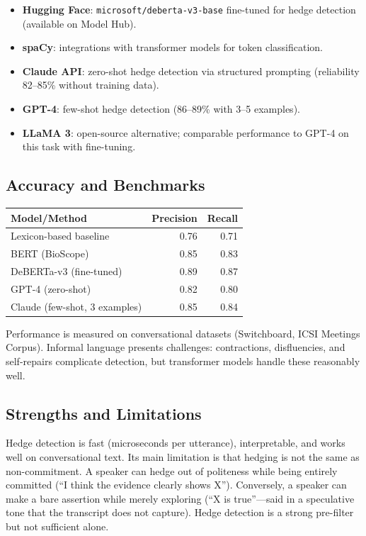 \documentclass[11pt,letterpaper]{article}
\begin{document}
\begin{itemize}
  \item \textbf{Hugging Face}: \texttt{microsoft/deberta-v3-base} fine-tuned for hedge detection (available on Model Hub).
  \item \textbf{spaCy}: integrations with transformer models for token classification.
  \item \textbf{Claude API}: zero-shot hedge detection via structured prompting (reliability 82–85\% without training data).
  \item \textbf{GPT-4}: few-shot hedge detection (86–89\% with 3–5 examples).
  \item \textbf{LLaMA 3}: open-source alternative; comparable performance to GPT-4 on this task with fine-tuning.
\end{itemize}

\subsection{Accuracy and Benchmarks}

\begin{center}
\begin{tabular}{lrr}
  \toprule
  \textbf{Model/Method} & \textbf{Precision} & \textbf{Recall} \\
  \midrule
  Lexicon-based baseline & 0.76 & 0.71 \\
  BERT (BioScope) & 0.85 & 0.83 \\
  DeBERTa-v3 (fine-tuned) & 0.89 & 0.87 \\
  GPT-4 (zero-shot) & 0.82 & 0.80 \\
  Claude (few-shot, 3 examples) & 0.85 & 0.84 \\
  \bottomrule
\end{tabular}
\end{center}

Performance is measured on conversational datasets (Switchboard, ICSI Meetings Corpus). Informal language presents challenges: contractions, disfluencies, and self-repairs complicate detection, but transformer models handle these reasonably well.

\subsection{Strengths and Limitations}

Hedge detection is fast (microseconds per utterance), interpretable, and works well on conversational text. Its main limitation is that hedging is not the same as non-commitment. A speaker can hedge out of politeness while being entirely committed (``I think the evidence clearly shows X''). Conversely, a speaker can make a bare assertion while merely exploring (``X is true''—said in a speculative tone that the transcript does not capture). Hedge detection is a strong pre-filter but not sufficient alone.
\end{document}

